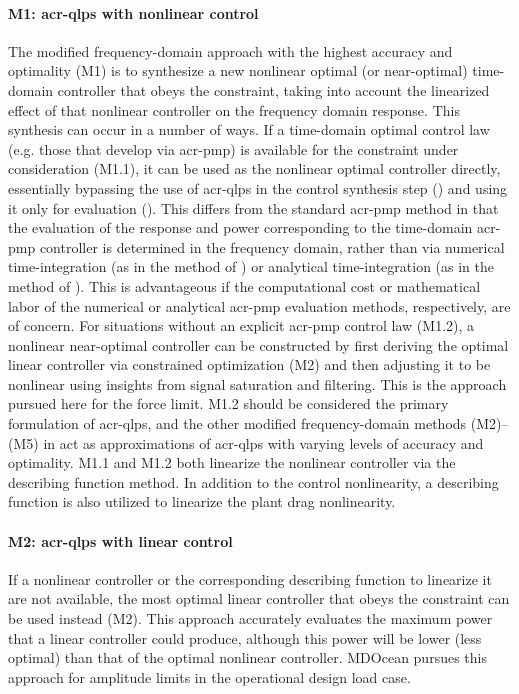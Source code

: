\paragraph{M1: \gls{acr-qlps} with nonlinear control}
The modified frequency-domain approach with the highest accuracy and optimality (M1) is to synthesize a new nonlinear optimal (or near-optimal) time-domain controller that obeys the constraint, taking into account the linearized effect of that nonlinear controller on the frequency domain response.
This synthesis can occur in a number of ways.
If a time-domain optimal control law (e.g. those that \citet{abdulkadir_optimal_2024,lin_fast_2025} develop via \gls{acr-pmp}) is available for the constraint under consideration (M1.1), it can be used as the nonlinear optimal controller directly, essentially bypassing the use of \gls{acr-qlps} in the control synthesis step () and using it only for evaluation ().
\ifdefined\DISSERTATION
    This differs from the standard \gls{acr-pmp} method in that the evaluation of the response and power corresponding to the time-domain \gls{acr-pmp} controller is determined in the frequency domain, rather than via numerical time-integration (as in the method of \citet{zou_optimal_2017}) or analytical time-integration (as in the method of \citet{lin_fast_2025}).
    This is advantageous if the computational cost or mathematical labor of the numerical or analytical \gls{acr-pmp} evaluation methods, respectively, are of concern.
\fi
For situations without an explicit \gls{acr-pmp} control law (M1.2), a nonlinear near-optimal controller can be constructed by first deriving the optimal linear controller via constrained optimization
(M2) and then adjusting it to be nonlinear using insights from signal saturation and filtering.
This is the approach pursued here for the force limit.
M1.2 should be considered the primary formulation of \gls{acr-qlps}, and the other modified frequency-domain methods (M2)--(M5) in  act as approximations of \gls{acr-qlps} with varying levels of accuracy and optimality.
M1.1 and M1.2 both linearize the nonlinear controller via the describing function method.
In addition to the control nonlinearity, a describing function is also utilized to linearize the plant drag nonlinearity.

\paragraph{M2: \gls{acr-qlps} with linear control}
If a nonlinear controller or the corresponding describing function to linearize it are not available, the most optimal linear controller that obeys the constraint can be used instead (M2).
This approach accurately evaluates the maximum power that a linear controller could produce, although this power will be lower (less optimal) than that of the optimal nonlinear controller.
MDOcean pursues this approach for amplitude limits in the operational design load case.

